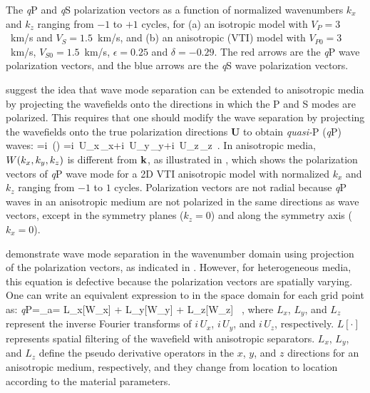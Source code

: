 {The {\it q}P and {\it q}S polarization vectors as a function of
normalized wavenumbers $k_x$ and $k_z$ ranging from $-1$ to $+1$
cycles, for (a) an isotropic model with $V_P=3$~km/s and
$V_S=1.5$~km/s, and (b) an anisotropic (VTI) model with
$V_{P0}=3$~km/s, $V_{S0}=1.5$~km/s, $\epsilon=0.25$ and
$\delta=-0.29$. The red arrows are the {\it q}P wave polarization vectors,
and the blue arrows are the {\it q}S wave polarization vectors.}




\cite{GEO55-07-09140919} suggest the idea that wave mode separation 
can be extended to anisotropic media by projecting the wavefields onto
the directions in which the P and S modes are polarized. This requires
that one should modify the wave separation  by projecting the
wavefields onto the true polarization directions {\textbf U} to obtain
{\it quasi-}P ({\it q}P) waves:
\beq\label{AniDivK}
\WqP=i\, \UU(\kk) \cdot \WWK 
=i\, U_x\,\WK_x+i\, U_y\,\WK_y+i\, U_z\,\WK_z\, .                
\eeq
In anisotropic media, $W(k_x,k_y,k_z)$ is different from ${\mathbf k}$, as
illustrated in , which shows the polarization
vectors of {\it q}P wave mode for a 2D VTI anisotropic model with normalized
$k_x$ and $k_z$ ranging from $-1$ to $1$ cycles. Polarization vectors are
not radial because {\it q}P waves in an anisotropic medium are not
polarized in the same directions as wave vectors, except in the
symmetry planes ($k_z=0$) and along the symmetry axis ($k_x=0$).

\cite{GEO55-07-09140919} demonstrate wave mode separation in 
the wavenumber domain using projection of the polarization vectors,
as indicated in . However, for heterogeneous media, this
equation is defective because the polarization vectors are spatially
varying. One can write an equivalent expression to  in
the space domain for each grid point as:
\beq\label{AniDivX}
{\it q}P=\nabla_a\cdot \WW     = L_x[W_x] 
                      + L_y[W_y] 
                      + L_z[W_z] \, ,
\eeq
where $L_x$, $L_y$, and $L_z$ represent the inverse Fourier transforms
of $i\, U_x$, $i\, U_y$, and $i\, U_z$, respectively.
$L\left[\cdot\right]$ represents spatial {filtering of the wavefield
with anisotropic separators}.  $L_x$, $L_y$, and $L_z$ define the
pseudo derivative operators in the $x$, $y$, and $z$ directions for an
anisotropic medium, respectively, and they change from location to
location according to the material parameters.

